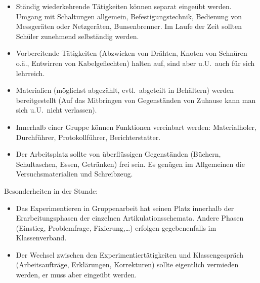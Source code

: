 \begin{itemize}
\begin{itemize}
	\end{itemize}
	
	\item
	St\"{a}ndig wiederkehrende T\"{a}tigkeiten k\"{o}nnen separat einge\"{u}bt werden.
	Umgang mit Schaltungen allgemein, Befestigungstechnik,
	Bedienung von Messger\"{a}ten oder Netzger\"{a}ten, Bunsenbrenner.
	Im Laufe der Zeit sollten Sch\"{u}ler zunehmend selbst\"{a}ndig werden.
	
	\item
	Vorbereitende T\"{a}tigkeiten (Abzwicken von Dr\"{a}hten,
	Knoten von Schn\"{u}ren o.\"{a}., Entwirren von Kabelgeflechten)
	halten auf, sind aber u.U.\ auch f\"{u}r sich lehrreich.
	\item
	Materialien (m\"{o}glichst abgez\"{a}hlt, evtl.\ abgeteilt in Beh\"{a}ltern)
	werden bereitgestellt
	(Auf das Mitbringen von Gegenst\"{a}nden von Zuhause kann man sich u.U.\
	nicht verlassen).
	\item
	Innerhalb einer Gruppe k\"{o}nnen Funktionen vereinbart werden:
	Materialholer, Durchf\"{u}hrer, Protokollf\"{u}hrer, Berichterstatter.
	\item
	Der Arbeitsplatz sollte von \"{u}berfl\"{u}ssigen Gegenst\"{a}nden (B\"{u}chern,
	Schultaschen, Essen, Getr\"{a}nken) frei sein.
	Es gen\"{u}gen im Allgemeinen die Versuchsmaterialien und Schreibzeug.
\end{itemize}
	
Besonderheiten in der Stunde:
\begin{itemize}
	\item
	Das Experimentieren in Gruppenarbeit hat seinen Platz innerhalb der
	Erarbeitungsphasen der einzelnen Artikulationsschemata.
	Andere Phasen (Einstieg, Problemfrage, Fixierung,\dots)
	erfolgen gegebenenfalls im Klassenverband.
	\item
	Der Wechsel zwischen den Experimentiert\"{a}tigkeiten und
	Klassengespr\"{a}ch (Arbeitsauftr\"{a}ge, Erkl\"{a}rungen, Korrekturen)
	sollte eigentlich vermieden werden,
	er muss aber einge\"{u}bt werden.
\end{itemize}

\bip\bip
